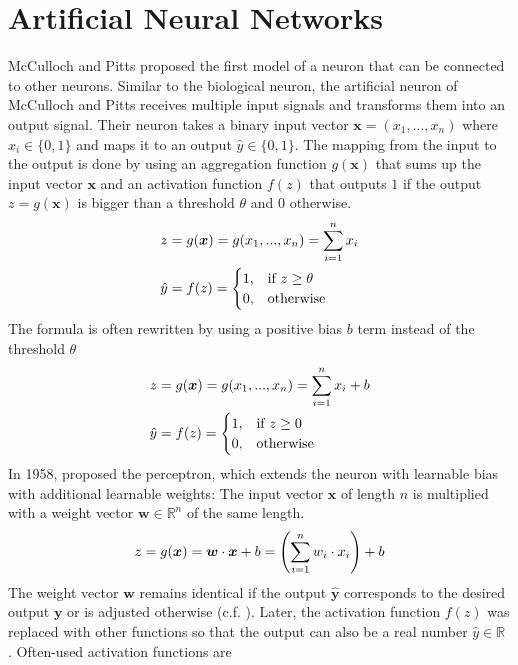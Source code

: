 \section{Artificial Neural Networks}
McCulloch and Pitts  proposed the first model of a neuron that can be connected to other neurons.
Similar to the biological neuron, the artificial neuron of McCulloch and Pitts receives multiple input signals and transforms them into an output signal.
Their neuron takes a binary input vector $\boldsymbol{x} = (x_1, ..., x_n)$ where $x_i \in \{0, 1\}$ and maps it to an output $\hat{y} \in \{0, 1\}$.
The mapping from the input to the output is done by using an aggregation function $g(\boldsymbol{x})$ that sums up the input vector $\boldsymbol{x}$ and an activation function $f(z)$ that outputs $1$ if the output $z = g(\boldsymbol{x})$ is bigger than a threshold $\theta$ and $0$ otherwise.
%
\begin{align}\eqlbl{McCulloch_Pitts_agg}%
	z &= g(\boldsymbol{x}) = g(x_1, ..., x_n) = \sum_{i=1}^{n}x_i\\
		\hat{y} &= f(z) = \begin{cases}
      		1, & \text{if}\ z \geq \theta \\
      		0, & \text{otherwise}
    	\end{cases}
\end{align}
%
The formula is often rewritten by using a positive  bias $b$ term instead of the  threshold $\theta$
%
\begin{align}\eqlbl{McCulloch_Pitts_agg}%
	z &= g(\boldsymbol{x}) = g(x_1, ..., x_n) = \sum_{i=1}^{n}x_i + b\\
		\hat{y} &= f(z) = \begin{cases}
      		1, & \text{if}\ z \geq 0 \\
      		0, & \text{otherwise}
    	\end{cases}
\end{align}
%
In 1958,  proposed the perceptron, which extends the neuron with learnable bias with additional learnable weights: The input vector $\boldsymbol{x}$ of length $n$ is multiplied with a weight vector $\boldsymbol{w} \in \mathbb{R}^n$ of the same length.
%
\begin{align}\eqlbl{nn}%
	z = g(\boldsymbol{x}) = \boldsymbol{w} \cdot \boldsymbol{x} + b = \left( \sum_{i=1}^{n}w_i \cdot x_i \right) + b
\end{align}
%
The weight vector $\boldsymbol{w}$ remains identical if the output $\boldsymbol{\hat{y}}$ corresponds to the desired output $\boldsymbol{y}$ or is adjusted otherwise (c.f. ). Later, the activation function \(f(z)\) was replaced with other functions so that the output can also be a real number \(\hat{y} \in \mathbb{R}\) . Often-used activation functions are
